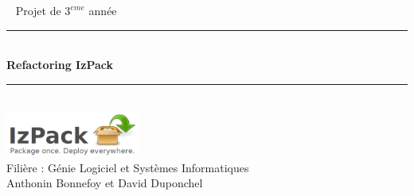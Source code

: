\begin{frame}[plain]
\begin{center}
~
\vfill
\Large Projet de $3^{eme}$ année\\[1cm]
\hrule
~\\[0.4cm]
{ \Huge \bfseries Refactoring IzPack}\\[0.4cm]
\hrule
~\\[0.4cm]
\includegraphics[height=1.5cm]{../image/izpack-logo-big.png}
\\[0.4cm]
\Large Filière : Génie Logiciel et Systèmes Informatiques\\
\Large Anthonin Bonnefoy et David Duponchel
\vfill
\end{center}
\end{frame}